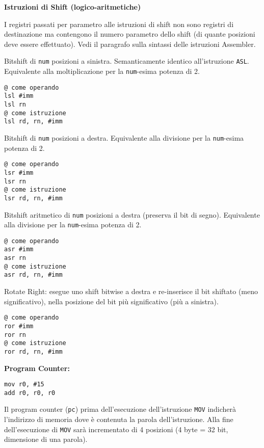 \begin{defn}
\textbf{Istruzioni di Shift (logico-aritmetiche)}

\begin{note}
	I registri passati per parametro alle istruzioni di shift non sono registri di destinazione ma contengono il numero parametro dello shift (di quante posizioni deve essere effettuato). Vedi il paragrafo sulla sintassi delle istruzioni Assembler.
\end{note}

Bitshift di \texttt{num} posizioni a sinistra. Semanticamente identico all'istruzione \texttt{ASL}. Equivalente alla moltiplicazione per la \texttt{num}-esima potenza di 2.
\begin{lstlisting}[style=arm]
@ come operando
lsl #imm
lsl rn
@ come istruzione
lsl rd, rn, #imm
\end{lstlisting}

Bitshift di \texttt{num} posizioni a destra. Equivalente alla divisione per la \texttt{num}-esima potenza di 2.
\begin{lstlisting}[style=arm]
@ come operando
lsr #imm
lsr rn
@ come istruzione
lsr rd, rn, #imm
\end{lstlisting}


Bitshift aritmetico di \texttt{num} posizioni a destra (preserva il bit di segno). Equivalente alla divisione per la \texttt{num}-esima potenza di 2.
\begin{lstlisting}[style=arm]
@ come operando
asr #imm
asr rn
@ come istruzione
asr rd, rn, #imm
\end{lstlisting}



Rotate Right: esegue uno shift bitwise a destra e re-inserisce il bit shiftato (meno significativo), nella posizione del bit più significativo (più a sinistra).
\begin{lstlisting}[style=arm]
@ come operando
ror #imm
ror rn
@ come istruzione
ror rd, rn, #imm
\end{lstlisting}

\end{defn}


\begin{exmp}
\textbf{Program Counter:}


\begin{lstlisting}[style=arm]
mov r0, #15
add r0, r0, r0
\end{lstlisting}


Il program counter (\texttt{pc}) prima dell'esecuzione dell'istruzione \texttt{MOV} indicherà l'indirizzo di memoria dove è contenuta la parola dell'istruzione. Alla fine dell'esecuzione di \texttt{MOV} sarà incrementato di 4 posizioni (4 byte = 32 bit, dimensione di una parola).
\end{exmp}

